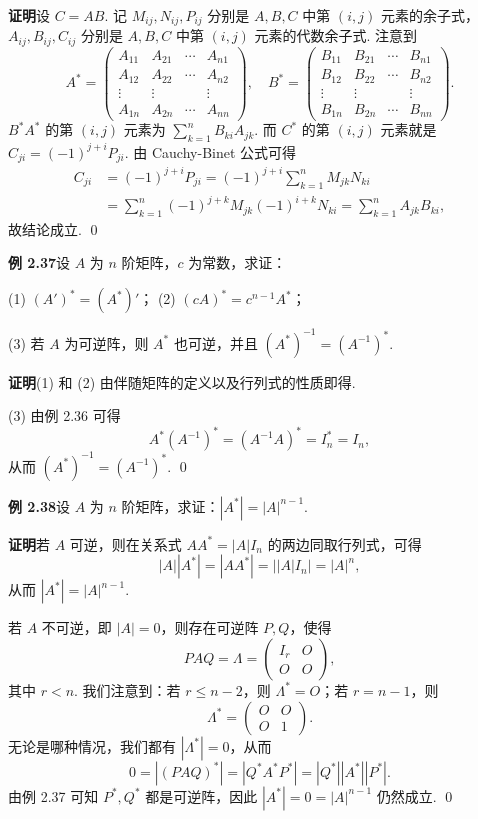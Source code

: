 \documentclass[UTF8,12pt,a4paper,fontset=fandol]{ctexart}
\begin{document}
\noindent\textbf{证明}\quad 设 $C=AB$. 记 $M_{ij},N_{ij},P_{ij}$ 分别是 $A,B,C$ 中第 $(i,j)$ 元素的余子式，$A_{ij},B_{ij},C_{ij}$ 分别是 $A,B,C$ 中第 $(i,j)$ 元素的代数余子式. 注意到
\[
A^*=
\left(
\begin{array}{cccc}
A_{11} & A_{21} & \cdots & A_{n1}\\
A_{12} & A_{22} & \cdots & A_{n2}\\
\vdots & \vdots & & \vdots\\
A_{1n} & A_{2n} & \cdots & A_{nn}
\end{array}
\right),\quad
B^*=
\left(
\begin{array}{cccc}
B_{11} & B_{21} & \cdots & B_{n1}\\
B_{12} & B_{22} & \cdots & B_{n2}\\
\vdots & \vdots & & \vdots\\
B_{1n} & B_{2n} & \cdots & B_{nn}
\end{array}
\right).
\]
$B^*A^*$ 的第 $(i,j)$ 元素为 $\sum\limits_{k=1}^n B_{ki}A_{jk}$. 而 $C^*$ 的第 $(i,j)$ 元素就是 $C_{ji}=(-1)^{j+i}P_{ji}$. 由 Cauchy-Binet 公式可得
\[
\begin{aligned}
C_{ji}
&=(-1)^{j+i}P_{ji}
=(-1)^{j+i}\sum_{k=1}^n M_{jk}N_{ki}\\
&=\sum_{k=1}^n(-1)^{j+k}M_{jk}(-1)^{i+k}N_{ki}
=\sum_{k=1}^n A_{jk}B_{ki},
\end{aligned}
\]
故结论成立. \qed

\noindent\textbf{例 2.37}\quad 设 $A$ 为 $n$ 阶矩阵，$c$ 为常数，求证：

(1) $(A')^*=(A^*)'$；\qquad
(2) $(cA)^*=c^{n-1}A^*$；

(3) 若 $A$ 为可逆阵，则 $A^*$ 也可逆，并且 $(A^*)^{-1}=(A^{-1})^*$.

\noindent\textbf{证明}\quad (1) 和 (2) 由伴随矩阵的定义以及行列式的性质即得.

(3) 由例 2.36 可得
\[
A^*(A^{-1})^*=(A^{-1}A)^*=I_n^*=I_n,
\]
从而 $(A^*)^{-1}=(A^{-1})^*$. \qed

\noindent\textbf{例 2.38}\quad 设 $A$ 为 $n$ 阶矩阵，求证：$|A^*|=|A|^{n-1}$.

\noindent\textbf{证明}\quad 若 $A$ 可逆，则在关系式 $AA^*=|A|I_n$ 的两边同取行列式，可得
\[
|A||A^*|=|AA^*|=||A|I_n|=|A|^n,
\]
从而 $|A^*|=|A|^{n-1}$.

若 $A$ 不可逆，即 $|A|=0$，则存在可逆阵 $P,Q$，使得
\[
PAQ=\Lambda=
\left(
\begin{array}{cc}
I_r & O\\
O & O
\end{array}
\right),
\]
其中 $r<n$. 我们注意到：若 $r\le n-2$，则 $\Lambda^*=O$；若 $r=n-1$，则
\[
\Lambda^*=
\left(
\begin{array}{cc}
O & O\\
O & 1
\end{array}
\right).
\]
无论是哪种情况，我们都有 $|\Lambda^*|=0$，从而
\[
0=|(PAQ)^*|=|Q^*A^*P^*|=|Q^*||A^*||P^*|.
\]
由例 2.37 可知 $P^*,Q^*$ 都是可逆阵，因此 $|A^*|=0=|A|^{n-1}$ 仍然成立. \qed
\end{document}
